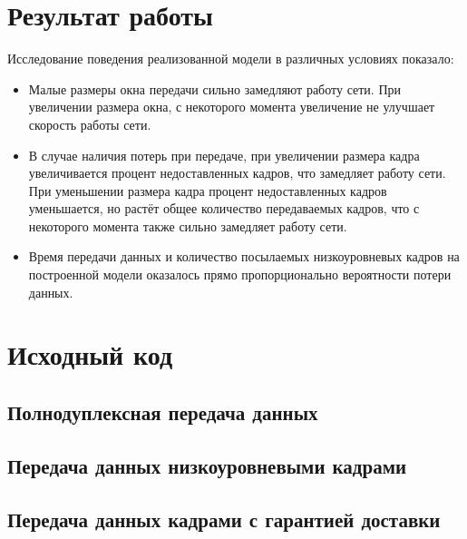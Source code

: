 \documentclass[a4paper,10pt]{article}
\begin{document}
\section{Результат работы}
Исследование поведения реализованной модели в различных условиях показало:
\begin{itemize}
  \item Малые размеры окна передачи сильно замедляют работу сети.
  При увеличении размера окна, 
  с некоторого момента увеличение не улучшает скорость работы сети.
  \item В случае наличия потерь при передаче, 
  при увеличении размера кадра увеличивается процент недоставленных кадров,
  что замедляет работу сети. 
  При уменьшении размера кадра процент недоставленных кадров уменьшается,
  но растёт общее количество передаваемых кадров, что с некоторого момента
  также сильно замедляет работу сети.
  \item Время передачи данных и количество посылаемых низкоуровневых кадров на построенной модели
  оказалось прямо пропорционально вероятности потери данных.
\end{itemize}

\pagebreak

\appendix
\section{Исходный код}
\label{appendix:sources}


\subsection{Полнодуплексная передача данных}
\label{appendix:sources:duplex-link}

\subsection{Передача данных низкоуровневыми кадрами}
\label{appendix:sources:frame}

\subsection{Передача данных кадрами с гарантией доставки}
\label{appendix:sources:sliding-window}


\pagebreak



\end{document}
